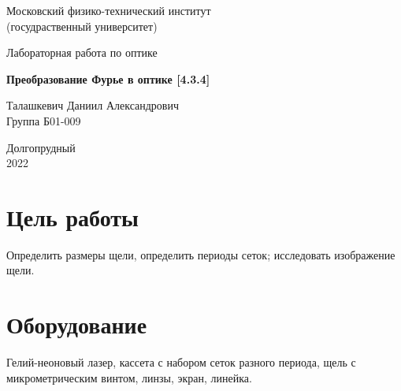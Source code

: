 \documentclass[a4paper, 12pt]{article}%
\begin{document}
\begin{titlepage}

	\newpage
	\begin{center}
		\normalsize Московский физико-технический институт \\(госудраственный 			университет)
	\end{center}

	\vspace{6em}

	\begin{center}
		\Large Лабораторная работа по оптике\\
	\end{center}

	\vspace{1em}

	\begin{center}
		\large \textbf{Преобразование Фурье в оптике [4.3.4]}
	\end{center}

	\vspace{2em}

	\begin{center}
		\large Талашкевич Даниил Александрович\\
		Группа Б01-009
	\end{center}

	\vspace{\fill}

	\begin{center}
	Долгопрудный \\2022
	\end{center}
	
\end{titlepage}



	\thispagestyle{empty}
	\newpage
	\tableofcontents
	\newpage
	\setcounter{page}{1}

	\section{Цель работы}
	
Определить размеры щели, определить периоды сеток; исследовать изображение щели.
	\section{Оборудование}

	Гелий-неоновый лазер, кассета с набором сеток разного периода, щель с микрометрическим винтом, линзы, экран, линейка.
\end{document}

